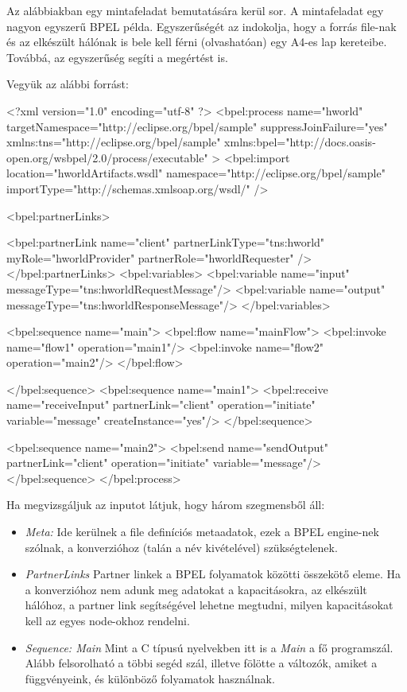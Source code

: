 Az alábbiakban egy mintafeladat bemutatására kerül sor. A mintafeladat egy nagyon egyszerű BPEL példa. Egyszerűségét az indokolja, hogy a forrás file-nak és az elkészült hálónak is bele kell férni (olvashatóan) egy A4-es lap kereteibe. Továbbá, az egyszerűség segíti a megértést is.


Vegyük az alábbi forrást:

\begin{cpp}
<?xml version="1.0" encoding="utf-8" ?>
<bpel:process name="hworld"
 targetNamespace="http://eclipse.org/bpel/sample"
 suppressJoinFailure="yes"
 xmlns:tns="http://eclipse.org/bpel/sample"
 xmlns:bpel="http://docs.oasis-open.org/wsbpel/2.0/process/executable"
 >
  <bpel:import location="hworldArtifacts.wsdl" 
	namespace="http://eclipse.org/bpel/sample"
	importType="http://schemas.xmlsoap.org/wsdl/" />

  <bpel:partnerLinks>
   
    <bpel:partnerLink name="client"
                 partnerLinkType="tns:hworld"
                 myRole="hworldProvider"
                 partnerRole="hworldRequester"
										 />
  </bpel:partnerLinks>
  <bpel:variables> 
    <bpel:variable name="input"
              messageType="tns:hworldRequestMessage"/>
    <bpel:variable name="output"
              messageType="tns:hworldResponseMessage"/>
  </bpel:variables>
  
  <bpel:sequence name="main">
    <bpel:flow name="mainFlow">
      <bpel:invoke name="flow1" operation="main1"/>
      <bpel:invoke name="flow2" operation="main2"/>
    </bpel:flow>
   
  </bpel:sequence>
  <bpel:sequence name="main1">
    <bpel:receive name="receiveInput" partnerLink="client"
           operation="initiate" variable="message"
           createInstance="yes"/>
  </bpel:sequence>

  <bpel:sequence name="main2">
    <bpel:send name="sendOutput" partnerLink="client"
               operation="initiate" variable="message"/>
  </bpel:sequence>
</bpel:process>
\end{cpp}

Ha megvizsgáljuk az inputot látjuk, hogy három szegmensből áll:
\begin{itemize}
\item \emph{Meta:} Ide kerülnek a file definíciós metaadatok, ezek a BPEL engine-nek szólnak, a konverzióhoz (talán a  név kivételével) szükségtelenek.
\item \emph{PartnerLinks} Partner linkek a BPEL folyamatok közötti összekötő eleme. Ha a konverzióhoz nem adunk meg adatokat a kapacitásokra, az elkészült hálóhoz, a partner link segítségével lehetne megtudni, milyen kapacitásokat kell az egyes node-okhoz rendelni. 
\item \emph{Sequence: Main} Mint a C típusú nyelvekben itt is a \emph{Main} a fő programszál. Alább felsorolható a többi segéd szál, illetve fölötte a változók, amiket a függvényeink, és különböző folyamatok használnak. 
\end{itemize}

